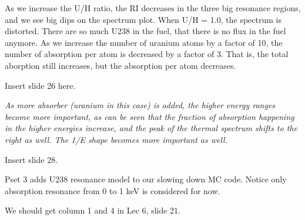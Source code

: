\documentclass{school-22.211-notes}
\date{February 27, 2012}
\begin{document}
\maketitle

As we increase the U/H ratio, the RI decreases in the three big resonance regions, and we see big dips on the spectrum plot. When U/H = 1.0, the spectrum is distorted. There are so much U238 in the fuel, that there is no flux in the fuel anymore. As we increase the number of uranium atoms by a factor of 10, the number of absorption per atom is decreased by a factor of 3. That is, the total aborption still increases, but the absorption per atom decreases. 

Insert slide 26 here. 

\textit{As more absorber (uranium in this case) is added, the higher energy ranges become more important, as can be seen that the fraction of absorption happening in the higher energies increase, and the peak of the thermal spectrum shifts to the right as well. The 1/E shape becomes more important as well.}

Insert slide 28. 





Pset 3 adds U238 resonance model to our slowing down MC code. Notice only absorption resonance from 0 to 1 keV is considered for now. 

We should get column 1 and 4 in Lec 6,  slide 21. 
\end{document}

